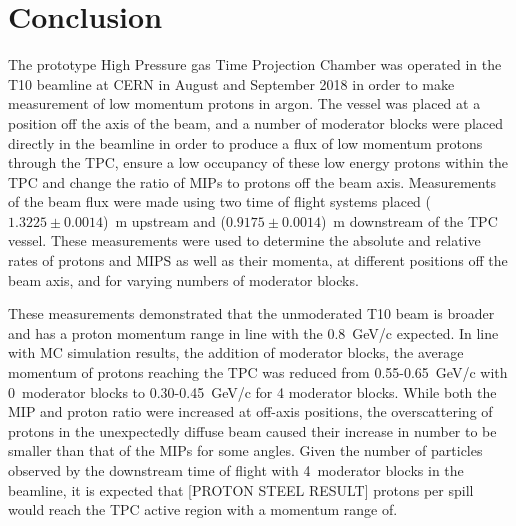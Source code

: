 \section{Conclusion}
\label{hptpcPaper:sec:Conclusion}

The prototype High Pressure gas Time Projection Chamber was operated in the T10 beamline at CERN in August and September 2018 in order to make measurement of low momentum protons in argon.
The vessel was placed at a position off the axis of the beam, and a number of moderator blocks were placed directly in the beamline in order to produce a flux of low momentum protons through the TPC, ensure a low occupancy of these low energy protons within the TPC and change the ratio of MIPs to protons off the beam axis.
Measurements of the beam flux were made using two time of flight systems placed ($1.3225 \pm 0.0014$)~m upstream and ($0.9175 \pm 0.0014$)~m downstream of the TPC vessel.
These measurements were used to determine the absolute and relative rates of protons and MIPS as well as their momenta, at different positions off the beam axis, and for varying numbers of moderator blocks.

These measurements demonstrated that the unmoderated T10 beam is broader and has a proton momentum range in line with the 0.8~GeV/c expected.
In line with MC simulation results, the addition of moderator blocks, the average momentum of protons reaching the TPC was reduced from 0.55-0.65~GeV/c with 0~moderator blocks to 0.30-0.45~GeV/c for 4 moderator blocks.
While both the MIP and proton ratio were increased at off-axis positions, the overscattering of protons in the unexpectedly diffuse beam caused their increase in number to be smaller than that of the MIPs for some angles.
Given the number of particles observed by the downstream time of flight with 4~moderator blocks in the beamline, it is expected that [PROTON STEEL RESULT] protons per spill would reach the TPC active region with a momentum range of.

